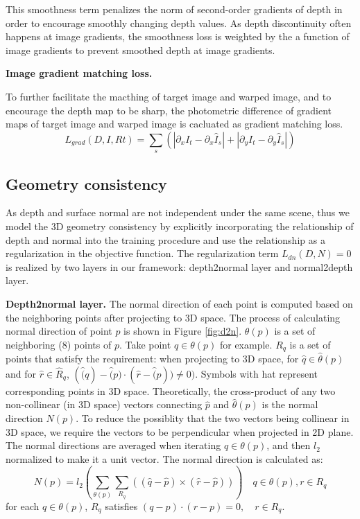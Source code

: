 This smoothness term penalizes the norm of second-order gradients of depth in order to encourage smoothly changing depth values. As depth discontinuity often happens at image gradients, the smoothness loss is weighted by the a function of image gradients to prevent smoothed depth at image gradients. 

\textbf{Image gradient matching loss.}

To further facilitate the macthing of target image and warped image, and to encourage the depth map to be sharp, the photometric difference of gradient maps of target image and warped image is cacluated as gradient matching loss.
$$L_{grad}(D, I, Rt) = \sum_s(|\partial_xI_t - \partial_x\hat{I}_s| + |\partial_yI_t - \partial_y\hat{I}_s|)$$


\subsection{Geometry consistency}

As depth and surface normal are not independent under the same scene, 
thus we model the 3D geometry consistency by explicitly incorporating the relationship of depth and normal into the training procedure and use the relationship as a regularization in the objective function. The regularization term $L_{dn}(D,N) = 0$ is realized by two layers in our framework: depth2normal layer and normal2depth layer.

\textbf{Depth2normal layer.} 
\label{chap:d2n}
The normal direction of each point is computed based on the neighboring points after projecting to 3D space. The process of calculating normal direction of point $p$ is shown in Figure \ref{fig:d2n}. $\theta(p)$ is a set of neighboring (8) points of $p$. Take point $q \in \theta(p)$ for example. $R_{q}$ is a set of points that satisfy the requirement: when projecting to 3D space, for $\hat{q} \in \hat{\theta}(p)$ and for $\hat{r} \in \hat{R}_{q}$, $(\hat(q)-\hat(p) \cdot (\hat{r} - \hat(p)) \neq 0)$. Symbols with hat represent corresponding points in 3D space. Theoretically, the cross-product of any two non-collinear (in 3D space) vectors connecting $\hat{p}$ and $\hat{\theta}(p)$ is the normal direction $N(p)$. To reduce the possiblity that the two vectors being collinear in 3D space, we require the vectors to be perpendicular when projected in 2D plane. The normal directions are averaged when iterating $q \in \theta(p)$, and then $l_2$ normalized to make it a unit vector. The normal direction is calculated as:
$$N(p) = l_2(\sum_{\theta(p)}\sum_{R_q}((\hat{q} - \hat{p}) \times (\hat{r} - \hat{p}))) \quad q \in \theta(p), r \in R_q$$
for each $q\in\theta(p)$, $R_q$ satisfies $(q-p)\cdot(r-p) = 0, \quad r \in R_q$.

